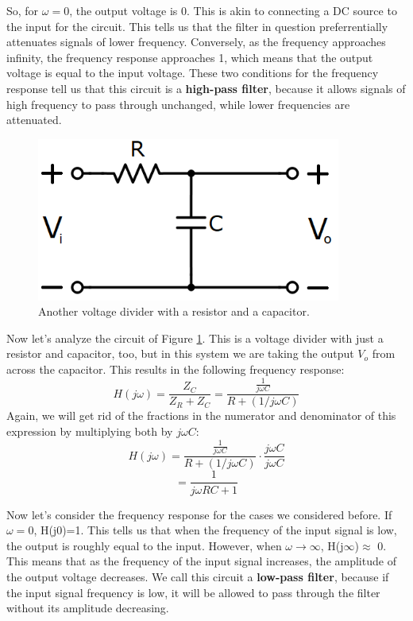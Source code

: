 So, for $\omega=0$, the output voltage is 0. This is akin to connecting a DC source to the input for the circuit. This tells us that the filter in question preferrentially attenuates signals of lower frequency. Conversely, as the frequency approaches infinity, the frequency response approaches 1, which means that the output voltage is equal to the input voltage. These two conditions for the frequency response tell us that this circuit is a \textbf{high-pass filter}, because it allows signals of high frequency to pass through unchanged, while lower frequencies are attenuated.
\begin{figure}[h!]
\centering
\includegraphics[width=10cm]{figures/RC_LP.png}
\caption{Another voltage divider with a resistor and a capacitor.}
\label{RC_LP}
\end{figure}
\par
Now let's analyze the circuit of Figure \ref{RC_LP}. This is a voltage divider with just a resistor and capacitor, too, but in this system we are taking the output $V_o$ from across the capacitor. This results in the following frequency response:
$$
H(j\omega) = \frac{Z_C}{Z_R+Z_C} = \frac{\frac{1}{j\omega C}}{R+(1/j\omega C)}
$$
Again, we will get rid of the fractions in the numerator and denominator of this expression by multiplying both by $j\omega C$:
$$
H(j\omega) = \frac{\frac{1}{j\omega C}}{R+(1/j\omega C)}\cdot\frac{j\omega C}{j\omega C} 
$$
$$
= \frac{1}{j\omega RC + 1}
$$
\par
Now let's consider the frequency response for the cases we considered before. If $\omega=0$, H(j0)=1. This tells us that when the frequency of the input signal is low, the output is roughly equal to the input. However, when $\omega\rightarrow\infty$, H(j$\infty$)$\approx$ 0. This means that as the frequency of the input signal increases, the amplitude of the output voltage decreases. We call this circuit a \textbf{low-pass filter}, because if the input signal frequency is low, it will be allowed to pass through the filter without its amplitude decreasing.
